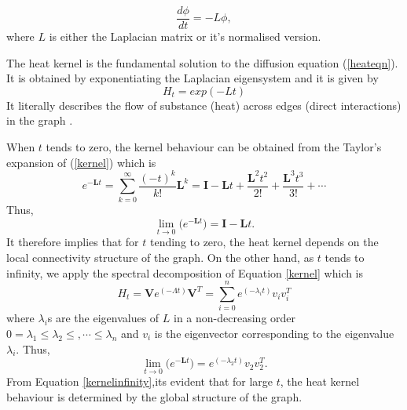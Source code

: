 \documentclass[10pt,a4paper]{article}
\begin{document}
        \begin{equation}
        \frac{d \phi}{dt} = -L \phi,
        \label{heateqn}
        \end{equation}
        where $L$ is either the Laplacian matrix or it's normalised version. 
        
        The heat kernel is the fundamental solution to the diffusion equation (\ref{heateqn}). It is obtained by exponentiating the Laplacian eigensystem and it is given by
        \begin{equation}
        H_t = exp(-Lt) 
        \label{kernel}
        \end{equation}
        It literally describes the flow of substance (heat) across edges (direct interactions) in the graph \citep{xiao2009graph}.
       
        When $t$ tends to zero, the kernel behaviour can be obtained from the Taylor's expansion of (\ref{kernel}) which is 
        \begin{equation}
        e^{-\mathbf{L}t} = \sum_{k=0}^{\infty} \frac{(-t)^k}{k!} \mathbf{L}^k = \mathbf{I} -\mathbf{L}t + \frac{\mathbf{L}^2 t^2}{2!} + \frac{\mathbf{L}^3 t^3}{3!}+ \cdots
        \end{equation}
        Thus,
        \begin{equation}
        \lim_{t\longrightarrow 0} \Big(e^{-\mathbf{L}t}\Big) = \mathbf{I} - \mathbf{L}t.
        \label{kerneltozero}
        \end{equation}
        It therefore implies that for $t$ tending to zero, the heat kernel depends on the local connectivity structure of the graph.
        On the other hand, as $t$ tends to infinity, we apply the spectral decomposition of Equation \ref{kernel} which is 
        \begin{equation}
        H_t = \mathbf{V} e^{(-\Lambda t)} \mathbf{V}^T =  \sum_{i=0}^n e^{(-\lambda_i t)} v_i v_i^T 
        \end{equation}
        where $\lambda_i$s are the eigenvalues of $L$ in a non-decreasing order $0=\lambda_1 \leq  \lambda_2 \leq, \cdots \leq \lambda_n$ and $v_i$ is the eigenvector corresponding to the eigenvalue $\lambda_i$. Thus,
        \begin{equation}
        \lim_{t\longrightarrow 0} \Big(e^{-\mathbf{L}t}\Big) = e^{(-\lambda_2 t)} v_2 v _2^T.
        \label{kernelinfinity}  
        \end{equation}
        From Equation \ref{kernelinfinity},its evident that for large $t$, the heat kernel behaviour is determined by the global structure of the graph. 
\end{document}
